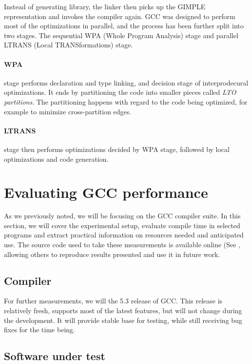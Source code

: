 Instead of generating library, the linker then picks up the GIMPLE
representation and invokes the compiler again. GCC was designed to perform most
of the optimizations in parallel, and the process has been further split into
two stages. The sequential WPA (Whole Program Analysis) stage and parallel
LTRANS (Local TRANSformations) stage.

\paragraph{WPA} stage performs declaration and type linking, and decision stage
of interprodecural optimizations. It ends by partitioning the code into smaller
pieces called {\sl LTO partitions}. The partitioning happens with regard to the
code being optimized, for example to minimize cross-partition edges.

\paragraph{LTRANS} stage then performs optimizations decided by WPA stage,
followed by local optimizations and code generation.


\section{Evaluating GCC performance}

As we previously noted, we will be focusing on the GCC compiler suite. In this
section, we will cover the experimental setup, evaluate compile time in selected
programs and extract practical information on resources needed and anticipated
use.  The source code used to take these measurements is available online (See
, allowing others to reproduce results presented and use it in future
work.  

\subsection{Compiler}

For further measurements, we will the 5.3 release of GCC. This release is
relatively fresh, supports most of the latest features, but will not change
during the development. It will provide stable base for testing, while still
receiving bug fixes for the time being. 

\subsection{Software under test}

